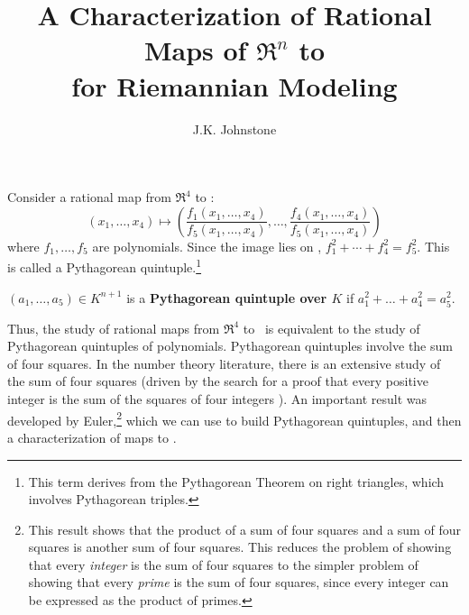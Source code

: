 \newif\ifFull
\Fullfalse

\SingleSpace

\setlength{\oddsidemargin}{0pt}
\setlength{\headsep}{3em}
\setlength{\textheight}{8.75in}
\setlength{\textwidth}{6.5in}
\setlength{\columnsep}{5mm}		%

\pagestyle{myheadings}


\title{A Characterization of Rational Maps of $\Re^n$ to \\for Riemannian Modeling}
\author{J.K. Johnstone}


\maketitle

\clearpage

\noindent Consider a rational map from $\Re^4$ to :
\[
	(x_1,\ldots,x_4) \mapsto
	(\frac{f_1(x_1,\ldots,x_4)}{f_{5}(x_1,\ldots,x_4)}, \ldots,
	 \frac{f_4(x_1,\ldots,x_4)}{f_{5}(x_1,\ldots,x_4)})
\]
where $f_1,\ldots,f_{5}$ are polynomials.
Since the image lies on , $f_1^2 + \cdots + f_4^2 = f_{5}^2$.
This is called a Pythagorean quintuple.\footnote{This term derives
	from the Pythagorean Theorem on right triangles,
	which involves Pythagorean triples.}
\begin{defn2}
$(a_1,\ldots,a_{5}) \in K^{n+1}$
is a {\bf Pythagorean quintuple over $K$} 
if $a_1^2 + \ldots + a_4^2 = a_5^2$.
\end{defn2}
%
Thus, the study of rational maps from $\Re^{4}$ to \ 
is equivalent to the study of Pythagorean quintuples of polynomials.
Pythagorean quintuples involve the sum of four squares.
In the number theory literature, there is an extensive study of the
sum of four squares (driven by the search for a proof that
every positive integer is the sum of the squares of four integers \cite{dickson52}).
An important result was developed by Euler,\footnote{This result shows that the product of a sum of four squares and a sum of four
	squares is another sum of four squares.
	This reduces the problem of showing that every {\em integer} is the sum
	of four squares to the simpler problem
	of showing that every {\em prime} is the sum of four squares,
	since every integer can be expressed as the product of primes.}
which we can use to build Pythagorean quintuples, 
and then a characterization of maps to .

